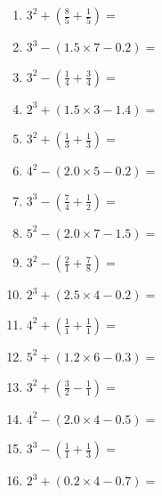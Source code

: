 \documentclass[12pt]{article}
\begin{document}
\begin{enumerate}
\item \large $ 3^{2} + (\frac{8}{5} + \frac{1}{5}) = $ \vspace{1.6cm}
\item \large $ 3^{3} - (1.5 \times 7 - 0.2) = $ \vspace{1.6cm}
\item \large $ 3^{2} - (\frac{1}{4} + \frac{3}{4}) = $ \vspace{1.6cm}
\item \large $ 2^{3} + (1.5 \times 3 - 1.4) = $ \vspace{1.6cm}
\item \large $ 3^{2} + (\frac{1}{3} + \frac{1}{3}) = $ \vspace{1.6cm}
\item \large $ 4^{2} - (2.0 \times 5 - 0.2) = $ \vspace{1.6cm}
\newpage
\item \large $ 3^{3} - (\frac{7}{4} + \frac{1}{2}) = $ \vspace{1.6cm}
\item \large $ 5^{2} - (2.0 \times 7 - 1.5) = $ \vspace{1.6cm}
\item \large $ 3^{2} - (\frac{2}{1} + \frac{7}{8}) = $ \vspace{1.6cm}
\item \large $ 2^{3} + (2.5 \times 4 - 0.2) = $ \vspace{1.6cm}
\item \large $ 4^{2} + (\frac{1}{1} + \frac{1}{1}) = $ \vspace{1.6cm}
\item \large $ 5^{2} + (1.2 \times 6 - 0.3) = $ \vspace{1.6cm}
\item \large $ 3^{2} + (\frac{3}{2} - \frac{1}{1}) = $ \vspace{1.6cm}
\item \large $ 4^{2} - (2.0 \times 4 - 0.5) = $ \vspace{1.6cm}
\item \large $ 3^{3} - (\frac{1}{1} + \frac{1}{3}) = $ \vspace{1.6cm}
\item \large $ 2^{3} + (0.2 \times 4 - 0.7) = $ \vspace{1.6cm}
\end{enumerate}\newpage
\end{document}
